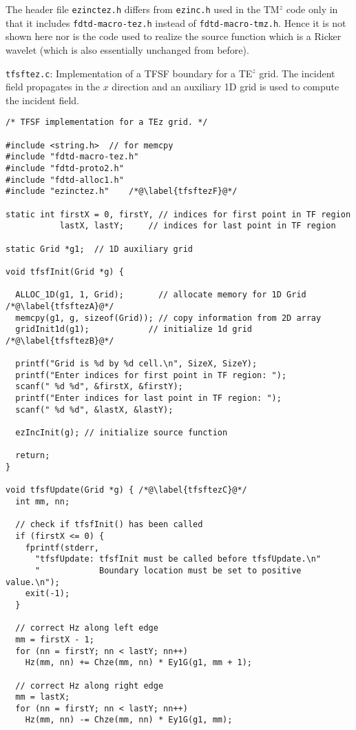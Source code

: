 The header file {\tt ezinctez.h} differs from {\tt ezinc.h} used in
the TM$^z$ code only in that it includes {\tt fdtd-macro-tez.h}
instead of {\tt fdtd-macro-tmz.h}.  Hence it is not shown here nor is
the code used to realize the source function which is a Ricker
wavelet (which is also essentially unchanged from before).

\begin{program}
{\tt tfsftez.c}:  Implementation of a TFSF boundary for a TE$^z$
grid.  The incident field propagates in the $x$ direction and an
auxiliary 1D grid is used to compute the incident field.
\label{pro:tfsftez}
\codemiddle
\begin{lstlisting}
/* TFSF implementation for a TEz grid. */

#include <string.h>  // for memcpy
#include "fdtd-macro-tez.h"
#include "fdtd-proto2.h"
#include "fdtd-alloc1.h"
#include "ezinctez.h"    /*@\label{tfsftezF}@*/

static int firstX = 0, firstY, // indices for first point in TF region 
           lastX, lastY;     // indices for last point in TF region

static Grid *g1;  // 1D auxiliary grid

void tfsfInit(Grid *g) {

  ALLOC_1D(g1, 1, Grid);       // allocate memory for 1D Grid /*@\label{tfsftezA}@*/
  memcpy(g1, g, sizeof(Grid)); // copy information from 2D array
  gridInit1d(g1);            // initialize 1d grid /*@\label{tfsftezB}@*/

  printf("Grid is %d by %d cell.\n", SizeX, SizeY);
  printf("Enter indices for first point in TF region: ");
  scanf(" %d %d", &firstX, &firstY);
  printf("Enter indices for last point in TF region: ");
  scanf(" %d %d", &lastX, &lastY);

  ezIncInit(g); // initialize source function

  return;
}

void tfsfUpdate(Grid *g) { /*@\label{tfsftezC}@*/
  int mm, nn;

  // check if tfsfInit() has been called
  if (firstX <= 0) {
    fprintf(stderr,
      "tfsfUpdate: tfsfInit must be called before tfsfUpdate.\n"
      "            Boundary location must be set to positive value.\n");
    exit(-1);
  }

  // correct Hz along left edge
  mm = firstX - 1;
  for (nn = firstY; nn < lastY; nn++)
    Hz(mm, nn) += Chze(mm, nn) * Ey1G(g1, mm + 1);
  
  // correct Hz along right edge
  mm = lastX;
  for (nn = firstY; nn < lastY; nn++)
    Hz(mm, nn) -= Chze(mm, nn) * Ey1G(g1, mm);
  

\end{lstlisting}
\end{program}
